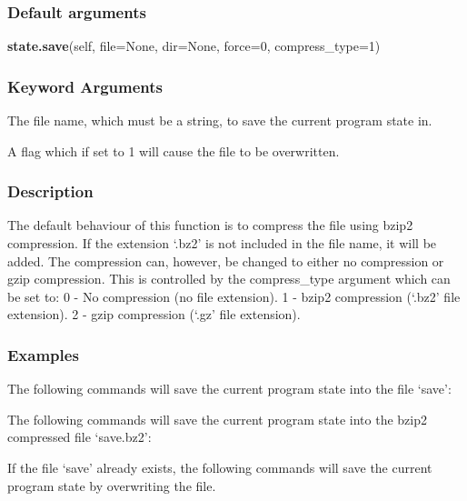 \subsubsection{Default arguments}

\textsf{\textbf{state.save}(self, file=None, dir=None, force=0, compress\_type=1)}


\subsubsection{Keyword Arguments}

  The file name, which must be a string, to save the current program state in.

  A flag which if set to 1 will cause the file to be overwritten.

\subsubsection{Description}

The default behaviour of this function is to compress the file using bzip2 compression.  If
the extension `.bz2' is not included in the file name, it will be added.  The compression
can, however, be changed to either no compression or gzip compression.  This is controlled
by the compress\_type argument which can be set to:
    0 - No compression (no file extension).
    1 - bzip2 compression (`.bz2' file extension).
    2 - gzip compression (`.gz' file extension).


\subsubsection{Examples}

The following commands will save the current program state into the file `save':



The following commands will save the current program state into the bzip2 compressed file
`save.bz2':



If the file `save' already exists, the following commands will save the current program
state by overwriting the file.




